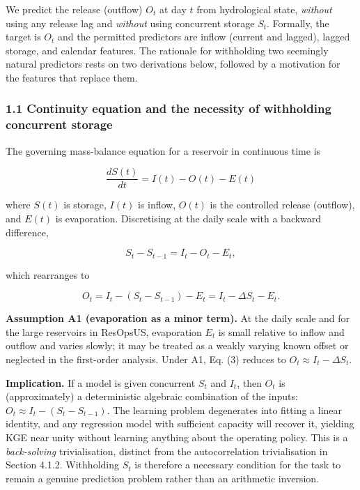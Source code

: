 \documentclass[journal]{ascelike-new}
\begin{document}
We predict the release (outflow) $O_t$ at day $t$ from hydrological state, \emph{without} using any release lag and \emph{without} using concurrent storage $S_t$. Formally, the target is $O_t$ and the permitted predictors are inflow (current and lagged), lagged storage, and calendar features. The rationale for withholding two seemingly natural predictors rests on two derivations below, followed by a motivation for the features that replace them.


\subsubsection{1.1 Continuity equation and the necessity of withholding concurrent storage}


The governing mass-balance equation for a reservoir in continuous time is


\begin{equation}\frac{dS(t)}{dt} = I(t) - O(t) - E(t) \tag{1}\end{equation}


where $S(t)$ is storage, $I(t)$ is inflow, $O(t)$ is the controlled release (outflow), and $E(t)$ is evaporation. Discretising at the daily scale with a backward difference,


\begin{equation}S_t - S_{t-1} = I_t - O_t - E_t, \tag{2}\end{equation}


which rearranges to


\begin{equation}O_t = I_t - (S_t - S_{t-1}) - E_t = I_t - \Delta S_t - E_t. \tag{3}\end{equation}


\textbf{Assumption A1 (evaporation as a minor term).} At the daily scale and for the large reservoirs in ResOpsUS, evaporation $E_t$ is small relative to inflow and outflow and varies slowly; it may be treated as a weakly varying known offset or neglected in the first-order analysis. Under A1, Eq. (3) reduces to $O_t \approx I_t - \Delta S_t$.


\textbf{Implication.} If a model is given concurrent $S_t$ and $I_t$, then $O_t$ is (approximately) a deterministic algebraic combination of the inputs: $O_t \approx I_t - (S_t - S_{t-1})$. The learning problem degenerates into fitting a linear identity, and any regression model with sufficient capacity will recover it, yielding KGE near unity without learning anything about the operating policy. This is a \emph{back-solving} trivialisation, distinct from the autocorrelation trivialisation in Section 4.1.2. Withholding $S_t$ is therefore a necessary condition for the task to remain a genuine prediction problem rather than an arithmetic inversion.
\end{document}
